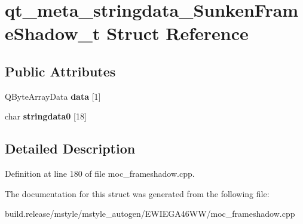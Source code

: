 \hypertarget{structqt__meta__stringdata___sunken_frame_shadow__t}{}\section{qt\+\_\+meta\+\_\+stringdata\+\_\+\+Sunken\+Frame\+Shadow\+\_\+t Struct Reference}
\label{structqt__meta__stringdata___sunken_frame_shadow__t}
\subsection*{Public Attributes}
\begin{DoxyCompactItemize}
\item 
\mbox{\label{structqt__meta__stringdata___sunken_frame_shadow__t_a6263de55c08b74e0f1e239e49346e1c7}} 
Q\+Byte\+Array\+Data {\bfseries data} \mbox{[}1\mbox{]}
\item 
\mbox{\label{structqt__meta__stringdata___sunken_frame_shadow__t_af9831f9d819ab1d2fc353acaf28865b0}} 
char {\bfseries stringdata0} \mbox{[}18\mbox{]}
\end{DoxyCompactItemize}


\subsection{Detailed Description}


Definition at line 180 of file moc\+\_\+frameshadow.\+cpp.



The documentation for this struct was generated from the following file\+:\begin{DoxyCompactItemize}
\item 
build.\+release/mstyle/mstyle\+\_\+autogen/\+E\+W\+I\+E\+G\+A46\+W\+W/moc\+\_\+frameshadow.\+cpp\end{DoxyCompactItemize}

